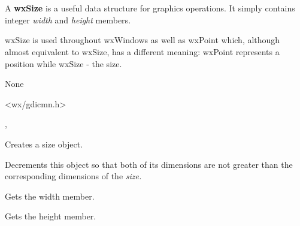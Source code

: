 \section{}\label{wxsize}

A {\bf wxSize} is a useful data structure for graphics operations.
It simply contains integer {\it width} and {\it height} members.

wxSize is used throughout wxWindows as well as wxPoint which, although almost
equivalent to wxSize, has a different meaning: wxPoint represents a position
while wxSize - the size.



None


<wx/gdicmn.h>


, 





Creates a size object.


\label{wxsizedecto}


Decrements this object so that both of its dimensions are not greater than the
corresponding dimensions of the \it{size}.




\label{wxsizegetwidth}


Gets the width member.

\label{wxsizegetheight}


Gets the height member.


\label{wxsizeincto}

